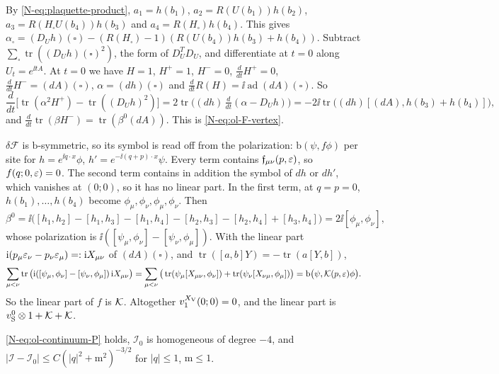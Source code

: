 \begin{step}
By \eqref{N-eq:plaquette-product}, $a_1=h(b_1)$, $a_2=R(U(b_1))h(b_2)$, $a_3=R(H_\square U(b_4))h(b_3)$ and $a_4=R(H_\square)h(b_4)$. This gives $\alpha_\square=(D_Uh)(\square)-(R(H_\square)-1)(R(U(b_4))h(b_3)+h(b_4))$. Subtract $\sum_\square\operatorname{tr}((D_Uh)(\square)^2)$, the form of $D_U^TD_U$, and differentiate at $t=0$ along $U_t=e^{\ii tA}$. At $t=0$ we have $H=1$, $H^+=1$, $H^-=0$, $\frac d{dt}H^+=0$, $\frac d{dt}H^-=(dA)(\square)$, $\alpha=(dh)(\square)$ and $\frac d{dt}R(H)=\ii\operatorname{ad}(dA)(\square)$. So
\[
\frac d{dt}\big[\operatorname{tr}(\alpha^2H^+)-\operatorname{tr}((D_Uh)^2)\big]=2\operatorname{tr}\big((dh)\,\tfrac d{dt}(\alpha-D_Uh)\big)=-2\ii\operatorname{tr}\big((dh)[(dA),h(b_3)+h(b_4)]\big),
\]
and $\frac d{dt}\operatorname{tr}(\beta H^-)=\operatorname{tr}(\beta^0(dA))$. This is \eqref{N-eq:ol-F-vertex}.

$\delta\mathcal F$ is $\mathrm b$-symmetric, so its symbol is read off from the polarization: $\mathrm b(\psi,f\phi)$ per site for $h=e^{\ii q\cdot x}\phi$, $h'=e^{-\ii(q+p)\cdot x}\psi$. Every term contains $\mathfrak f_{\mu\nu}(p,\varepsilon)$, so $f(q;0,\varepsilon)=0$. The second term contains in addition the symbol of $dh$ or $dh'$, which vanishes at $(0;0)$, so it has no linear part. In the first term, at $q=p=0$, $h(b_1),\dots,h(b_4)$ become $\phi_\mu,\phi_\nu,\phi_\mu,\phi_\nu$. Then
\[
\beta^0=\ii\big([h_1,h_2]-[h_1,h_3]-[h_1,h_4]-[h_2,h_3]-[h_2,h_4]+[h_3,h_4]\big)=2\ii[\phi_\mu,\phi_\nu],
\]
whose polarization is $\ii([\psi_\mu,\phi_\nu]-[\psi_\nu,\phi_\mu])$. With the linear part $\mathrm i(p_\mu\varepsilon_\nu-p_\nu\varepsilon_\mu)=:\mathrm i X_{\mu\nu}$ of $(dA)(\square)$, and $\operatorname{tr}([a,b]Y)=-\operatorname{tr}(a[Y,b])$,
\[
\sum_{\mu<\nu}\operatorname{tr}\big(\mathrm i([\psi_\mu,\phi_\nu]-[\psi_\nu,\phi_\mu])\,\mathrm i X_{\mu\nu}\big)=\sum_{\mu<\nu}\big(\operatorname{tr}(\psi_\mu[X_{\mu\nu},\phi_\nu])+\operatorname{tr}(\psi_\nu[X_{\nu\mu},\phi_\mu])\big)=\mathrm b\big(\psi,\mathcal K(p,\varepsilon)\phi\big).
\]
So the linear part of $f$ is $\mathcal K$. Altogether $v_1^{X_{\rm V}}(0;0)=0$, and the linear part is $v^0_{\rm S}\otimes1+\mathcal K+\mathcal K$.
\end{step}

\begin{detail}\label{d11b:continuum-integrand}
\eqref{N-eq:ol-continuum-P} holds, $\mathcal I_0$ is homogeneous of degree $-4$, and $|\mathcal I-\mathcal I_0|\le C(|q|^2+\mathrm m^2)^{-3/2}$ for $|q|\le1$, $\mathrm m\le1$.
\end{detail}

